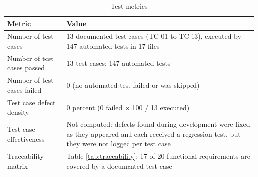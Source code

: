 \begin{table}[htbp]
\centering
\caption{Test metrics}
\label{tab:test-metrics}
\begin{tabularx}{\textwidth}{p{}Y}
\toprule
\textbf{Metric} & \textbf{Value}\\
\midrule
Number of test cases & 13 documented test cases (TC-01 to TC-13), executed by 147 automated tests in 17 files\\
Number of test cases passed & 13 test cases; 147 automated tests\\
Number of test cases failed & 0 (no automated test failed or was skipped)\\
Test case defect density & 0 percent (0 failed $\times$ 100 / 13 executed)\\
Test case effectiveness & Not computed: defects found during development were fixed as they appeared and each received a regression test, but they were not logged per test case\\
Traceability matrix & Table \ref{tab:traceability}; 17 of 20 functional requirements are covered by a documented test case\\
\bottomrule
\end{tabularx}
\end{table}

